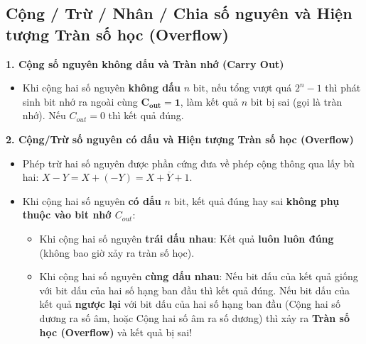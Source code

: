 \subsection{Cộng / Trừ / Nhân / Chia số nguyên và Hiện tượng Tràn số học (Overflow)}

\textbf{1. Cộng số nguyên không dấu và Tràn nhớ (Carry Out)}
\begin{itemize}
    \item Khi cộng hai số nguyên \textbf{không dấu} $n\text{ bit}$, nếu tổng vượt quá $2^n - 1$ thì phát sinh bit nhớ ra ngoài cùng $\mathbf{C_{out} = 1}$, làm kết quả $n\text{ bit}$ bị sai (gọi là tràn nhớ). Nếu $C_{out} = 0$ thì kết quả đúng.
\end{itemize}

\textbf{2. Cộng/Trừ số nguyên có dấu và Hiện tượng Tràn số học (Overflow)}
\begin{itemize}
    \item Phép trừ hai số nguyên được phần cứng đưa về phép cộng thông qua lấy bù hai: $X - Y = X + (-Y) = X + \overline{Y} + 1$.
    \item Khi cộng hai số nguyên \textbf{có dấu} $n\text{ bit}$, kết quả đúng hay sai \textbf{không phụ thuộc vào bit nhớ $C_{out}$}:
    \begin{itemize}
        \item Khi cộng hai số nguyên \textbf{trái dấu nhau}: Kết quả \textbf{luôn luôn đúng} (không bao giờ xảy ra tràn số học).
        \item Khi cộng hai số nguyên \textbf{cùng dấu nhau}: Nếu bit dấu của kết quả giống với bit dấu của hai số hạng ban đầu thì kết quả đúng. Nếu bit dấu của kết quả \textbf{ngược lại} với bit dấu của hai số hạng ban đầu (Cộng hai số dương ra số âm, hoặc Cộng hai số âm ra số dương) thì xảy ra \textbf{Tràn số học (Overflow)} và kết quả bị sai!
    \end{itemize}
\end{itemize}

